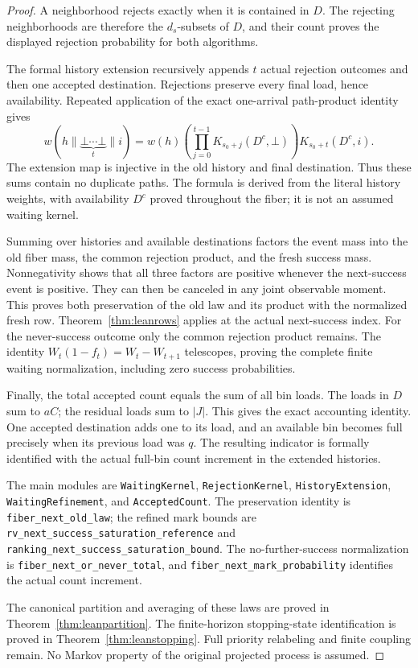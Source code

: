 \documentclass[11pt]{article}
\begin{document}
\begin{proof}
A neighborhood rejects exactly when it is contained in $D$. The rejecting
neighborhoods are therefore the $d_s$-subsets of $D$, and their count
proves the displayed rejection probability for both algorithms.

The formal history extension recursively appends $t$ actual rejection
outcomes and then one accepted destination. Rejections preserve every
final load, hence availability. Repeated application of the exact
one-arrival path-product identity gives
\[
 w(h\mathbin{\|}\underbrace{\bot\cdots\bot}_{t}\mathbin{\|}i)
 =w(h)\left(\prod_{j=0}^{t-1}K_{s_0+j}(D^c,\bot)\right)
 K_{s_0+t}(D^c,i).
\]
The extension map is injective in the old history and final destination.
Thus these sums contain no duplicate paths. The formula is derived from
the literal history weights, with availability $D^c$ proved throughout
the fiber; it is not an assumed waiting kernel.

Summing over histories and available destinations factors the event
mass into the old fiber mass, the common rejection product, and the
fresh success mass. Nonnegativity shows that all three factors are
positive whenever the next-success event is positive. They can then be
canceled in any joint observable moment. This proves both preservation
of the old law and its product with the normalized fresh row.
Theorem~\ref{thm:leanrows} applies at the actual next-success index.
For the never-success outcome only the common rejection product remains.
The identity $W_t(1-f_t)=W_t-W_{t+1}$ telescopes, proving the complete
finite waiting normalization, including zero success probabilities.

Finally, the total accepted count equals the sum of all bin loads.
The loads in $D$ sum to $aC$; the residual loads sum to $|J|$. This gives
the exact accounting identity. One accepted destination adds one to its
load, and an available bin becomes full precisely when its previous
load was $q$. The resulting indicator is formally identified with the
actual full-bin count increment in the extended histories.

The main modules are \texttt{WaitingKernel}, \texttt{RejectionKernel},
\texttt{HistoryExtension}, \texttt{WaitingRefinement}, and
\texttt{AcceptedCount}. The preservation identity is
\texttt{fiber\_next\_old\_law}; the refined mark bounds are
\texttt{rv\_next\_success\_saturation\_reference} and
\texttt{ranking\_next\_success\_saturation\_bound}.
The no-further-success normalization is
\texttt{fiber\_next\_or\_never\_total}, and
\texttt{fiber\_next\_mark\_probability} identifies the actual count increment.

The canonical partition and averaging of these laws are proved in
Theorem~\ref{thm:leanpartition}. The finite-horizon stopping-state
identification is proved in Theorem~\ref{thm:leanstopping}. Full
priority relabeling and finite coupling remain.
No Markov property of the original projected process is assumed.
\end{proof}
\end{document}
